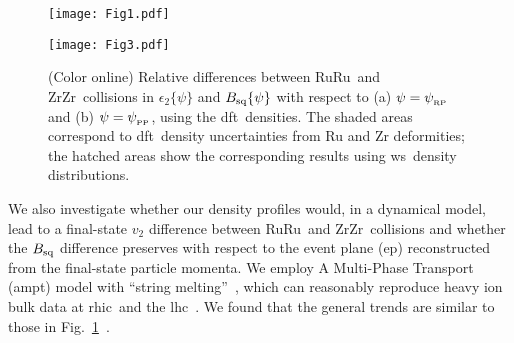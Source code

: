 \documentclass[3p,times,procedia]{elsarticle}
\newcommand {\rhic}	{{\sc rhic}}
\newcommand {\lhc}	{{\sc lhc}}
\newcommand {\dft}	{{\sc dft}}
\newcommand {\ampt}	{{\sc ampt}}
\newcommand {\ws}	{{\sc ws}}
\newcommand {\cme}	{{\mbox{\sc cme}}}
\newcommand {\EP}	{{\sc ep}}
\newcommand {\psiRP}	{\psi_{_{\rm RP}}}
\newcommand {\psiPP}	{\psi_{_{\rm PP}}}
\newcommand {\etwo}	{\epsilon_2}
\newcommand {\epsi}	{\etwo\{\psi\}}
\newcommand {\vv}	{v_2}
\newcommand {\rbf}	{{\bf r}}
\newcommand {\Ru}	{$^{96}_{44}$Ru}
\newcommand {\Zr}	{$^{96}_{40}$Zr}
\newcommand {\RuRu}	{RuRu}
\newcommand {\ZrZr}	{ZrZr}
\newcommand {\Bbf}	{\mathbf{B}}
\newcommand {\Bsq}	{B_{\rm sq}}
\newcommand {\Bpsi}	{\Bsq\{\psi\}}
\newcommand {\BRP}	{\Bsq\{\psiRP\}}
\newcommand {\BPP}	{\Bsq\{\psiPP\}}
\begin{document}
\begin{figure}[hbt]
	  \begin{minipage}[t]{0.35\linewidth}
  \begin{center}
   	 \texttt{[image: Fig1.pdf]}
  \end{center}
  \vspace{-0.2in}
  \caption{(Color online) Proton and neutron density distributions of the \Ru\ and \Zr\ nuclei, assumed spherical, calculated by the \dft\ method.}
  \label{fig:rho}
	  \end{minipage}
	  \hspace*{0.08\textwidth}
	  \begin{minipage}[t]{0.55\linewidth}
  \begin{center}
    \texttt{[image: Fig3.pdf]}
  \end{center}
  \vspace{-0.2in}
  \caption{(Color online) Relative differences between \RuRu\ and \ZrZr\ collisions in $\epsi$ and $\Bpsi$ with respect to (a) $\psi=\psiRP$ and (b) $\psi=\psiPP$, using the \dft\ densities. The shaded areas correspond to \dft\ density uncertainties from Ru and Zr deformities; the hatched areas show the corresponding results using \ws\ density distributions.
}
  \label{fig:R}
	  \end{minipage}
\end{figure}


We also investigate whether our density profiles would, in a dynamical model, lead to a final-state $\vv$ difference between \RuRu\ and \ZrZr\ collisions and whether the $\Bsq$ difference preserves with respect to the event plane (\EP) reconstructed from the final-state particle momenta. %
We employ A Multi-Phase Transport (\ampt) model with ``string melting''~\cite{Lin:2004en}, %
which can reasonably reproduce heavy ion bulk data at \rhic\ and the \lhc~. We found that the general trends are similar to those in Fig.~\ref{fig:R}~\cite{Xu:2017zcn}.
\end{document}
